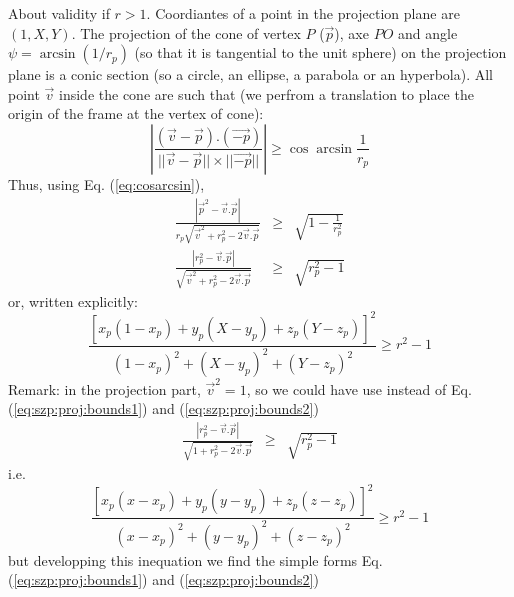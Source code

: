  About validity if $r>1$.
  Coordiantes of a point in the projection plane are $(1, X, Y)$.
  The projection of the cone of vertex $P$ ($\vec{p}$), axe $PO$ and angle $\psi=\arcsin(1/r_p)$ (so that it is tangential to the unit sphere)
  on the projection plane is a conic section (so a circle, an ellipse, a parabola or an hyperbola).
  All point $\vec{v}$ inside the cone are such that (we perfrom a translation to place the origin of the frame at the vertex of cone):
  \begin{equation*}
    |\frac{(\vec{v}-\vec{p}).(\vec{-p})}{||\vec{v}-\vec{p}||\times ||\vec{-p}||}| \ge \cos\arcsin\frac{1}{r_p}
  \end{equation*}
  Thus, using Eq. (\ref{eq:cosarcsin}),
  \begin{eqnarray*}
    \frac{|\vec{p}^2-\vec{v}.\vec{p}|}{r_p\sqrt{\vec{v}^2+r_p^2-2\vec{v}.\vec{p}}} & \ge & \sqrt{1 - \frac{1}{r_p^2}} \\
    \frac{|r_p^2-\vec{v}.\vec{p}|}{\sqrt{\vec{v}^2+r_p^2-2\vec{v}.\vec{p}}} & \ge & \sqrt{r_p^2 - 1}
  \end{eqnarray*}
  or, written explicitly:
  \begin{equation}
    \frac{\left[ x_p(1 - x_p) + y_p(X - y_p) + z_p(Y - z_p) \right]^2}{(1 - x_p)^2 + (X - y_p)^2 + (Y - z_p)^2} \ge r^2 - 1
  \end{equation}
  Remark: in the projection part, $\vec{v}^2=1$, so we could have use instead of Eq. (\ref{eq:szp:proj:bounds1}) and (\ref{eq:szp:proj:bounds2})
  \begin{eqnarray*}
    \frac{|r_p^2-\vec{v}.\vec{p}|}{\sqrt{1+r_p^2-2\vec{v}.\vec{p}}} & \ge & \sqrt{r_p^2 - 1}
  \end{eqnarray*}
  i.e.
  \begin{equation}
    \frac{\left[ x_p(x - x_p) + y_p(y - y_p) + z_p(z - z_p) \right]^2}{(x - x_p)^2 + (y - y_p)^2 + (z - z_p)^2} \ge r^2 - 1
  \end{equation}
  but developping this inequation we find the simple forms  Eq. (\ref{eq:szp:proj:bounds1}) and (\ref{eq:szp:proj:bounds2})

